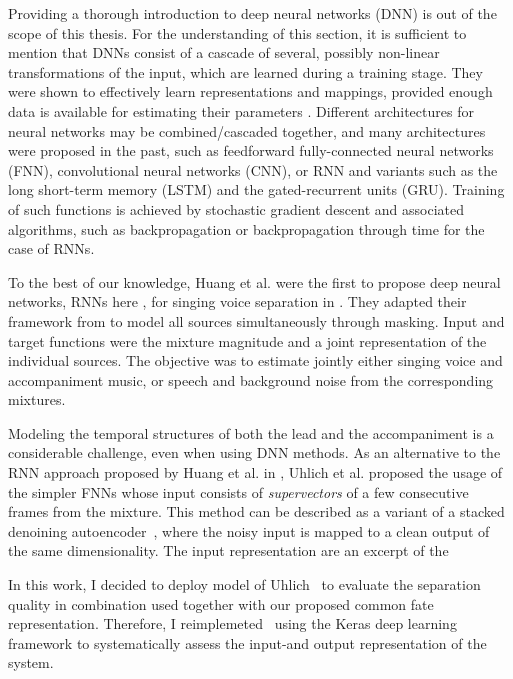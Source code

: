 Providing a thorough introduction to deep neural networks (DNN) is out of the scope of this thesis.
For the understanding of this section, it is sufficient to mention that DNNs consist of a cascade of several, possibly non-linear transformations of the input, which are learned during a training stage.
They were shown to effectively learn representations and mappings, provided enough data is available for estimating their parameters \cite{deng14, lecun15, goodfellow16}.
Different architectures for neural networks may be combined/cascaded together, and many architectures were proposed in the past, such as feedforward fully-connected neural networks (FNN), convolutional neural networks (CNN), or RNN and variants such as the long short-term memory (LSTM) and the gated-recurrent units (GRU). Training of such functions is achieved by stochastic gradient descent \cite{robbins51} and associated algorithms, such as backpropagation \cite{rumelhart862} or backpropagation through time \cite{rumelhart86} for the case of RNNs.
\par
To the best of our knowledge, Huang et al. were the first to propose deep neural networks, RNNs here \cite{hermans13,pascanu14}, for singing voice separation in \cite{huang14,huang15}. They adapted their framework from \cite{huang142} to model all sources simultaneously through masking. Input and target functions were the mixture magnitude and a joint representation of the individual sources. The objective was to estimate jointly either singing voice and accompaniment music, or speech and background noise from the corresponding mixtures.
\par
Modeling the temporal structures of both the lead and the accompaniment is a considerable challenge, even when using DNN methods. As an alternative to the RNN approach proposed by Huang et al. in \cite{huang14}, Uhlich et al. proposed the usage of the simpler FNNs \cite{uhlich15} whose input consists of \textit{supervectors} of a few consecutive frames from the mixture.
This method can be described as a variant of a stacked denoining autoencoder~\cite{pvincent08}, where the noisy input is mapped to a clean output of the same dimensionality.
The input representation are an excerpt of the
\par
In this work, I decided to deploy model of Uhlich~\cite{uhlich15} to evaluate the separation quality in combination used together with our proposed common fate representation.
Therefore, I reimplemeted~\cite{uhlich15} using the Keras deep learning framework to systematically assess the input-and output representation of the system.

